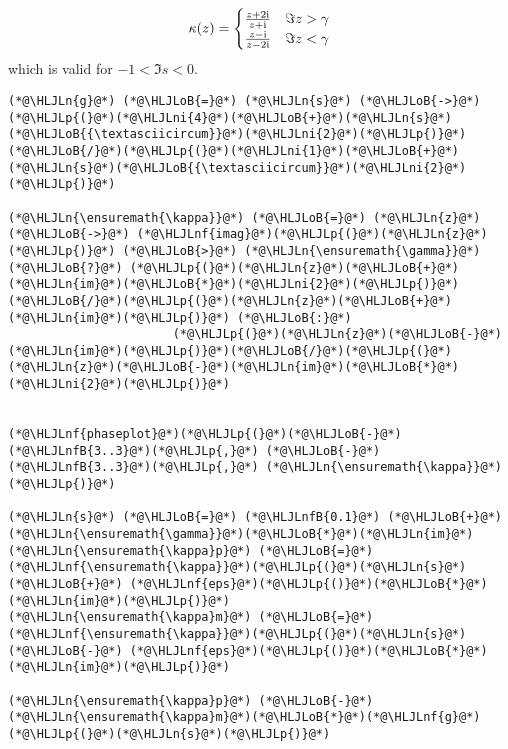 \documentclass[12pt,landscape]{article}
\newcommand{\HLJLn}[1]{#1}
\newcommand{\HLJLnf}[1]{\textcolor[RGB]{66,102,213}{#1}}
\newcommand{\HLJLnfB}[1]{\textcolor[RGB]{59,151,46}{#1}}
\newcommand{\HLJLni}[1]{\textcolor[RGB]{59,151,46}{#1}}
\newcommand{\HLJLoB}[1]{\textcolor[RGB]{102,102,102}{\textbf{#1}}}
\newcommand{\HLJLp}[1]{#1}
\def\I{ {\rm i} }
\begin{document}
{\[
\kappa(z) =  \begin{cases} {z + 2\I  \over z + \I}  & \Im z > \gamma \\
                            {z - \I  \over z - 2\I} & \Im z < \gamma
                            \end{cases}
\]
which is valid for $-1 < \Im s < 0$.


\begin{lstlisting}
(*@\HLJLn{g}@*) (*@\HLJLoB{=}@*) (*@\HLJLn{s}@*) (*@\HLJLoB{->}@*) (*@\HLJLp{(}@*)(*@\HLJLni{4}@*)(*@\HLJLoB{+}@*)(*@\HLJLn{s}@*)(*@\HLJLoB{{\textasciicircum}}@*)(*@\HLJLni{2}@*)(*@\HLJLp{)}@*)(*@\HLJLoB{/}@*)(*@\HLJLp{(}@*)(*@\HLJLni{1}@*)(*@\HLJLoB{+}@*)(*@\HLJLn{s}@*)(*@\HLJLoB{{\textasciicircum}}@*)(*@\HLJLni{2}@*)(*@\HLJLp{)}@*)

(*@\HLJLn{\ensuremath{\kappa}}@*) (*@\HLJLoB{=}@*) (*@\HLJLn{z}@*) (*@\HLJLoB{->}@*) (*@\HLJLnf{imag}@*)(*@\HLJLp{(}@*)(*@\HLJLn{z}@*)(*@\HLJLp{)}@*) (*@\HLJLoB{>}@*) (*@\HLJLn{\ensuremath{\gamma}}@*) (*@\HLJLoB{?}@*) (*@\HLJLp{(}@*)(*@\HLJLn{z}@*)(*@\HLJLoB{+}@*)(*@\HLJLn{im}@*)(*@\HLJLoB{*}@*)(*@\HLJLni{2}@*)(*@\HLJLp{)}@*)(*@\HLJLoB{/}@*)(*@\HLJLp{(}@*)(*@\HLJLn{z}@*)(*@\HLJLoB{+}@*)(*@\HLJLn{im}@*)(*@\HLJLp{)}@*) (*@\HLJLoB{:}@*)
                       (*@\HLJLp{(}@*)(*@\HLJLn{z}@*)(*@\HLJLoB{-}@*)(*@\HLJLn{im}@*)(*@\HLJLp{)}@*)(*@\HLJLoB{/}@*)(*@\HLJLp{(}@*)(*@\HLJLn{z}@*)(*@\HLJLoB{-}@*)(*@\HLJLn{im}@*)(*@\HLJLoB{*}@*)(*@\HLJLni{2}@*)(*@\HLJLp{)}@*)


(*@\HLJLnf{phaseplot}@*)(*@\HLJLp{(}@*)(*@\HLJLoB{-}@*)(*@\HLJLnfB{3..3}@*)(*@\HLJLp{,}@*) (*@\HLJLoB{-}@*)(*@\HLJLnfB{3..3}@*)(*@\HLJLp{,}@*) (*@\HLJLn{\ensuremath{\kappa}}@*)(*@\HLJLp{)}@*)

(*@\HLJLn{s}@*) (*@\HLJLoB{=}@*) (*@\HLJLnfB{0.1}@*) (*@\HLJLoB{+}@*) (*@\HLJLn{\ensuremath{\gamma}}@*)(*@\HLJLoB{*}@*)(*@\HLJLn{im}@*)
(*@\HLJLn{\ensuremath{\kappa}p}@*) (*@\HLJLoB{=}@*) (*@\HLJLnf{\ensuremath{\kappa}}@*)(*@\HLJLp{(}@*)(*@\HLJLn{s}@*) (*@\HLJLoB{+}@*) (*@\HLJLnf{eps}@*)(*@\HLJLp{()}@*)(*@\HLJLoB{*}@*)(*@\HLJLn{im}@*)(*@\HLJLp{)}@*)
(*@\HLJLn{\ensuremath{\kappa}m}@*) (*@\HLJLoB{=}@*) (*@\HLJLnf{\ensuremath{\kappa}}@*)(*@\HLJLp{(}@*)(*@\HLJLn{s}@*) (*@\HLJLoB{-}@*) (*@\HLJLnf{eps}@*)(*@\HLJLp{()}@*)(*@\HLJLoB{*}@*)(*@\HLJLn{im}@*)(*@\HLJLp{)}@*)

(*@\HLJLn{\ensuremath{\kappa}p}@*) (*@\HLJLoB{-}@*) (*@\HLJLn{\ensuremath{\kappa}m}@*)(*@\HLJLoB{*}@*)(*@\HLJLnf{g}@*)(*@\HLJLp{(}@*)(*@\HLJLn{s}@*)(*@\HLJLp{)}@*)
\end{lstlisting}

}
\end{document}
